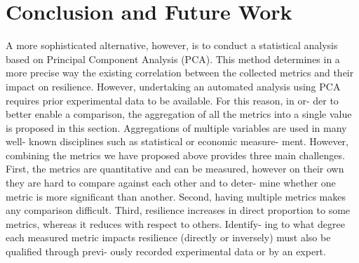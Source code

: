 \documentclass[final,5p,times,twocolumn]{elsarticle}
\begin{document}






\section{Conclusion and Future Work}



A more sophisticated alternative, however, is to conduct a statistical analysis based on Principal Component Analysis (PCA). This method determines in a more precise way the existing correlation between the collected metrics and their impact on resilience. However, undertaking an automated analysis using PCA requires prior experimental data to be available. For this reason, in or- der to better enable a comparison, the aggregation of all the metrics into a single value is proposed in this section. Aggregations of multiple variables are used in many well- known disciplines such as statistical or economic measure- ment. However, combining the metrics we have proposed above provides three main challenges. First, the metrics are quantitative and can be measured, however on their own they are hard to compare against each other and to deter- mine whether one metric is more significant than another. Second, having multiple metrics makes any comparison difficult. Third, resilience increases in direct proportion to some metrics, whereas it reduces with respect to others. Identify- ing to what degree each measured metric impacts resilience (directly or inversely) must also be qualified through previ- ously recorded experimental data or by an expert.










\end{document}
